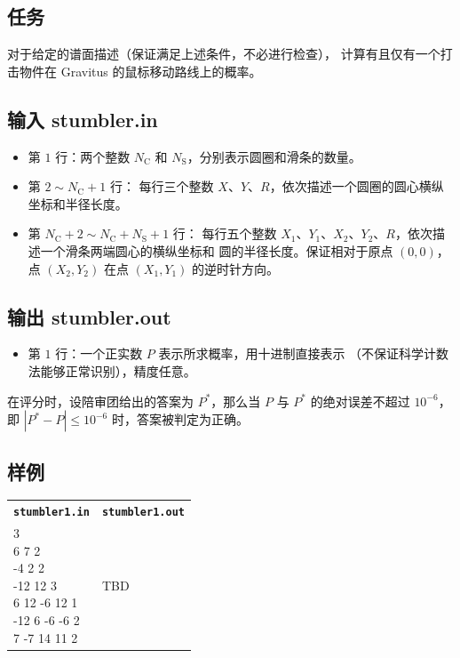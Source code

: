 \documentclass[UTF8, 11pt, a4paper]{article}
\begin{document}
\subsection*{任务}
对于给定的谱面描述（保证满足上述条件，不必进行检查），%
计算有且仅有一个打击物件在 Gravitus 的鼠标移动路线上的概率。

\subsection*{输入 \makebox[0.5em]{} \small{stumbler.in}}
\begin{itemize}
    \item 第 $1$ 行：两个整数 $N_\mathrm{C}$ 和 $N_\mathrm{S}$，分别表示圆圈和滑条的数量。
    \item 第 $2 \sim N_\mathrm{C} + 1$ 行：%
        每行三个整数 $X$、$Y$、$R$，依次描述一个圆圈的圆心横纵坐标和半径长度。
    \item 第 $N_\mathrm{C} + 2 \sim N_\mathrm{C} + N_\mathrm{S} + 1$ 行：%
        每行五个整数 $X_1$、$Y_1$、$X_2$、$Y_2$、$R$，依次描述一个滑条两端圆心的横纵坐标和%
        圆的半径长度。保证相对于原点 $(0, 0)$，点 $(X_2, Y_2)$ 在点 $(X_1, Y_1)$ 的逆时针方向。
\end{itemize}

\subsection*{输出 \makebox[0.5em]{} \small{stumbler.out}}
\begin{itemize}
    \item 第 $1$ 行：一个正实数 $P$ 表示所求概率，用十进制直接表示%
        （不保证科学计数法能够正常识别），精度任意。
\end{itemize}

在评分时，设陪审团给出的答案为 $P^*$，那么当 $P$ 与 $P^*$ 的绝对误差不超过 %
$10^{-6}$，即 $|P^* - P| \leq 10^{-6}$ 时，答案被判定为正确。

\subsection*{样例}
\begin{table}[h]\centering
\begin{tabularx}{0.8 \textwidth}{|X|X|}
\hline
\texttt{\textbf{stumbler1.in}} & \texttt{\textbf{stumbler1.out}} \\ \hline
{\ttfamily
3 3\newline
6 7 2\newline
-4 2 2\newline
-12 12 3\newline
6 12 -6 12 1\newline
-12 6 -6 -6 2\newline
7 -7 14 11 2
} & {\ttfamily
TBD
}
\\ \hline
\end{tabularx}\end{table}
\end{document}
